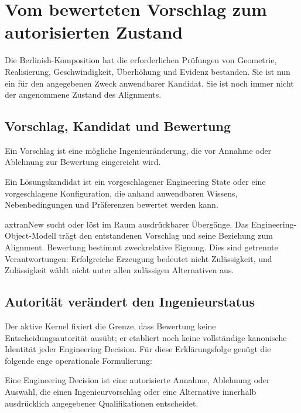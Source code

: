 
\chapter{Vom bewerteten Vorschlag zum autorisierten Zustand}
\label{chap:engineering-decisions}

Die Berlinish-Komposition hat die erforderlichen Prüfungen von Geometrie,
Realisierung, Geschwindigkeit, Überhöhung und Evidenz bestanden. Sie ist nun
ein für den angegebenen Zweck anwendbarer Kandidat. Sie ist noch immer nicht
der angenommene Zustand des Alignments.

\section{Vorschlag, Kandidat und Bewertung}

\begin{definition}[Vorschlag]
\label{def:proposal}
Ein Vorschlag ist eine mögliche Ingenieuränderung, die vor Annahme oder
Ablehnung zur Bewertung eingereicht wird.
\end{definition}

\begin{definition}[Lösungskandidat]
\label{def:candidate-solution}
Ein Lösungskandidat ist ein vorgeschlagener Engineering State oder eine
vorgeschlagene Konfiguration, die anhand anwendbaren Wissens,
Nebenbedingungen und Präferenzen bewertet werden kann.
\end{definition}

axtranNew sucht oder löst im Raum ausdrückbarer Übergänge. Das
Engineering-Object-Modell trägt den entstandenen Vorschlag und seine Beziehung
zum Alignment. Bewertung bestimmt zweckrelative Eignung. Dies sind getrennte
Verantwortungen: Erfolgreiche Erzeugung bedeutet nicht Zulässigkeit, und
Zulässigkeit wählt nicht unter allen zulässigen Alternativen aus.

\section{Autorität verändert den Ingenieurstatus}

Der aktive Kernel fixiert die Grenze, dass Bewertung keine
Entscheidungsautorität ausübt; er etabliert noch keine vollständige kanonische
Identität jeder Engineering Decision. Für diese Erklärungsfolge genügt die
folgende enge operationale Formulierung:

\begin{definition}
\label{def:engineering-decision}
Eine Engineering Decision ist eine autorisierte Annahme, Ablehnung oder
Auswahl, die einen Ingenieurvorschlag oder eine Alternative innerhalb
ausdrücklich angegebener Qualifikationen entscheidet.
\end{definition}

